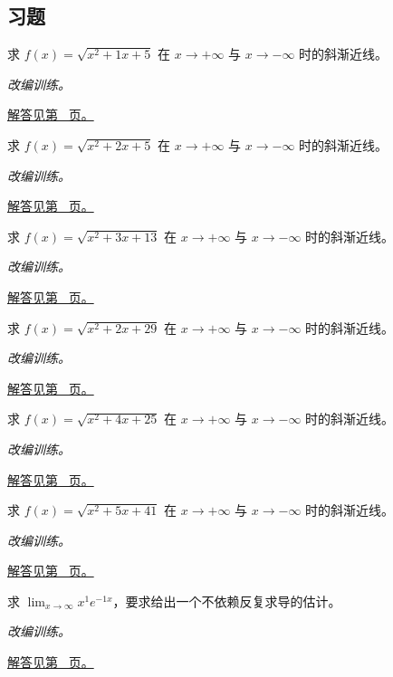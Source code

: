 \documentclass[12pt,fontset=fandol]{ctexart}
\begin{document}
\subsection{习题}
\begin{example}[二次根式的两端渐近线]\label{ex:c4q1}
求 $f(x)=\sqrt{x^2+1x+5}$ 在 $x\to+\infty$ 与 $x\to-\infty$ 时的斜渐近线。
\par\textit{改编训练。}\par\hyperref[ans:c4q1]{解答见第~\pageref{ans:c4q1} 页。}
\end{example}
\begin{example}[二次根式的两端渐近线]\label{ex:c4q2}
求 $f(x)=\sqrt{x^2+2x+5}$ 在 $x\to+\infty$ 与 $x\to-\infty$ 时的斜渐近线。
\par\textit{改编训练。}\par\hyperref[ans:c4q2]{解答见第~\pageref{ans:c4q2} 页。}
\end{example}
\begin{example}[二次根式的两端渐近线]\label{ex:c4q3}
求 $f(x)=\sqrt{x^2+3x+13}$ 在 $x\to+\infty$ 与 $x\to-\infty$ 时的斜渐近线。
\par\textit{改编训练。}\par\hyperref[ans:c4q3]{解答见第~\pageref{ans:c4q3} 页。}
\end{example}
\begin{example}[二次根式的两端渐近线]\label{ex:c4q4}
求 $f(x)=\sqrt{x^2+2x+29}$ 在 $x\to+\infty$ 与 $x\to-\infty$ 时的斜渐近线。
\par\textit{改编训练。}\par\hyperref[ans:c4q4]{解答见第~\pageref{ans:c4q4} 页。}
\end{example}
\begin{example}[二次根式的两端渐近线]\label{ex:c4q5}
求 $f(x)=\sqrt{x^2+4x+25}$ 在 $x\to+\infty$ 与 $x\to-\infty$ 时的斜渐近线。
\par\textit{改编训练。}\par\hyperref[ans:c4q5]{解答见第~\pageref{ans:c4q5} 页。}
\end{example}
\begin{example}[二次根式的两端渐近线]\label{ex:c4q6}
求 $f(x)=\sqrt{x^2+5x+41}$ 在 $x\to+\infty$ 与 $x\to-\infty$ 时的斜渐近线。
\par\textit{改编训练。}\par\hyperref[ans:c4q6]{解答见第~\pageref{ans:c4q6} 页。}
\end{example}
\begin{example}[指数增长压过多项式]\label{ex:c4q7}
求 $\displaystyle\lim_{x\to\infty}x^{1}e^{-1x}$，要求给出一个不依赖反复求导的估计。
\par\textit{改编训练。}\par\hyperref[ans:c4q7]{解答见第~\pageref{ans:c4q7} 页。}
\end{example}
\end{document}

